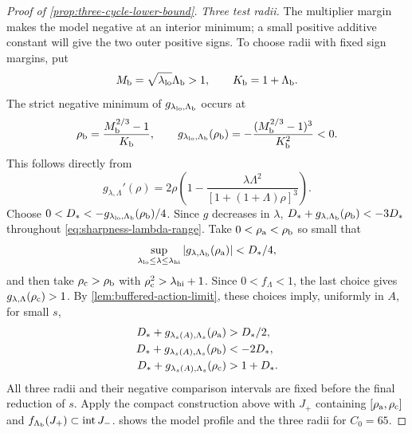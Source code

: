 \begin{proof}[Proof of \cref{prop:three-cycle-lower-bound}]
\emph{Three test radii.}
The multiplier margin makes the model negative at an interior
minimum; a small positive additive constant will give the two outer
positive signs. To choose radii with fixed sign margins, put
\[
 M_{\rm b}=\sqrt{\lambda_{\rm lo}}\Lambda_{\rm b}>1,\qquad
 K_{\rm b}=1+\Lambda_{\rm b}.
\]
The strict negative minimum of
\(g_{\lambda_{\rm lo},\Lambda_{\rm b}}\) occurs at
\begin{equation}
\label{eq:sharpness-negative-minimum}
 \rho_{\rm b}=\frac{M_{\rm b}^{2/3}-1}{K_{\rm b}},\qquad
 g_{\lambda_{\rm lo},\Lambda_{\rm b}}(\rho_{\rm b})
       =-\frac{(M_{\rm b}^{2/3}-1)^3}{K_{\rm b}^2}<0.
\end{equation}
This follows directly from
\[
 g_{\lambda,\Lambda}'(\rho)
   =2\rho\left(1-\frac{\lambda\Lambda^2}
                            {[1+(1+\Lambda)\rho]^3}\right).
\]
Choose \(0<D_*<-g_{\lambda_{\rm lo},\Lambda_{\rm b}}(\rho_{\rm b})/4\).
Since \(g\) decreases in \(\lambda\),
\(D_*+g_{\lambda,\Lambda_{\rm b}}(\rho_{\rm b})<-3D_*\)
throughout \eqref{eq:sharpness-lambda-range}.
Take \(0<\rho_{\rm a}<\rho_{\rm b}\) so small that
\[
 \sup_{\lambda_{\rm lo}\le\lambda\le\lambda_{\rm hi}}
       |g_{\lambda,\Lambda_{\rm b}}(\rho_{\rm a})|<D_*/4,
\]
and then take \(\rho_{\rm c}>\rho_{\rm b}\) with
\(\rho_{\rm c}^2>\lambda_{\rm hi}+1\).
Since \(0<f_\Lambda<1\), the last choice gives
\(g_{\lambda,\Lambda}(\rho_{\rm c})>1\).
By \cref{lem:buffered-action-limit}, these choices imply,
uniformly in \(A\), for small \(s\),
\begin{equation}
\label{eq:sharpness-three-model-signs}
 \begin{aligned}
 D_*+g_{\lambda_s(A),\Lambda_s}(\rho_{\rm a})&>D_*/2,\\
 D_*+g_{\lambda_s(A),\Lambda_s}(\rho_{\rm b})&<-2D_*,\\
 D_*+g_{\lambda_s(A),\Lambda_s}(\rho_{\rm c})&>1+D_*.
 \end{aligned}
\end{equation}
All three radii and their negative comparison intervals are
fixed before the final reduction of \(s\). Apply the compact construction
above with \(J_+\) containing \([\rho_{\rm a},\rho_{\rm c}]\) and
\(f_{\Lambda_{\rm b}}(J_+)\subset\operatorname{int}J_-\).
shows the model profile and the three radii for \(C_0=65\).




\end{proof}
